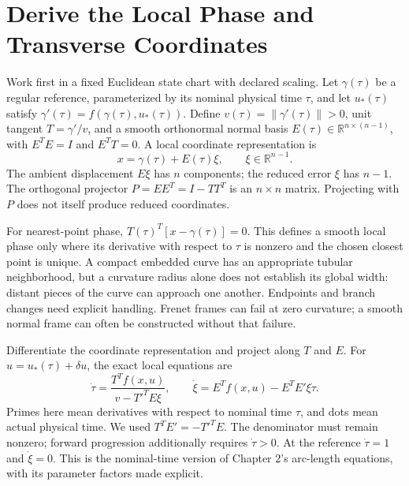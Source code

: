 \documentclass[12pt, openany]{book}
\theoremstyle{plain}
\begin{document}
\section{Derive the Local Phase and Transverse Coordinates}

Work first in a fixed Euclidean state chart with declared scaling. Let
$\gamma(\tau)$ be a regular reference, parameterized by its nominal physical
time $\tau$, and let $u_*(\tau)$ satisfy
$\gamma'(\tau)=f(\gamma(\tau),u_*(\tau))$. Define
$v(\tau)=\|\gamma'(\tau)\|>0$, unit tangent $T=\gamma'/v$, and a smooth
orthonormal normal basis $E(\tau)\in\mathbb R^{n\times(n-1)}$, with
$E^TE=I$ and $E^TT=0$. A local coordinate representation is
\begin{equation}\label{eq:decomposition}
 x=\gamma(\tau)+E(\tau)\xi,\qquad \xi\in\mathbb R^{n-1}.
\end{equation}
The ambient displacement $E\xi$ has $n$ components; the reduced error $\xi$
has $n-1$. The orthogonal projector $P=EE^T=I-TT^T$ is an $n\times n$
matrix. Projecting with $P$ does not itself produce reduced coordinates.

For nearest-point phase, $T(\tau)^T[x-\gamma(\tau)]=0$. This defines a smooth
local phase only where its derivative with respect to $\tau$ is nonzero and
the chosen closest point is unique. A compact embedded curve has an appropriate
tubular neighborhood, but a curvature radius alone does not establish its
global width: distant pieces of the curve can approach one another. Endpoints
and branch changes need explicit handling. Frenet frames can fail at zero
curvature; a smooth normal frame can often be constructed without that failure.

Differentiate the coordinate representation and project along $T$ and $E$.
For $u=u_*(\tau)+\delta u$, the exact local equations are
\begin{equation}\label{eq:orbital_exact_transverse}
 \dot\tau=\frac{T^Tf(x,u)}{v-T'^TE\xi},\qquad
 \dot\xi=E^Tf(x,u)-E^TE'\xi\dot\tau.
\end{equation}
Primes here mean derivatives with respect to nominal time $\tau$, and dots
mean actual physical time. We used $T^TE'=-T'^TE$. The denominator must remain
nonzero; forward progression additionally requires $\dot\tau>0$. At the
reference $\dot\tau=1$ and $\dot\xi=0$. This is the nominal-time version of
Chapter 2's arc-length equations, with its parameter factors made explicit.
\end{document}
